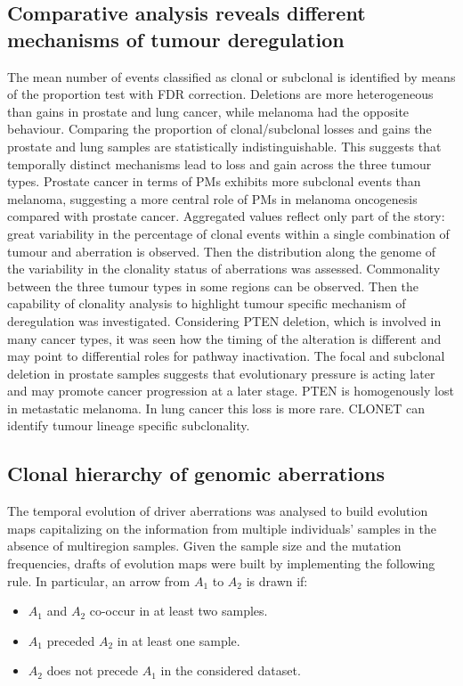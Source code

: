 	\subsection{Comparative analysis reveals different mechanisms of tumour deregulation}
	The mean number of events classified as clonal or subclonal is identified by means of the proportion test with FDR correction.
	Deletions are more heterogeneous than gains in prostate and lung cancer, while melanoma had the opposite behaviour.
	Comparing the proportion of clonal/subclonal losses and gains the prostate and lung samples are statistically indistinguishable.
	This suggests that temporally distinct mechanisms lead to loss and gain across the three tumour types.
	Prostate cancer in terms of PMs exhibits more subclonal events than melanoma, suggesting a more central role of PMs in melanoma oncogenesis compared with prostate cancer.
	Aggregated values reflect only part of the story: great variability in the percentage of clonal events within a single combination of tumour and aberration is observed.
	Then the distribution along the genome of the variability in the clonality status of aberrations was assessed.
	Commonality between the three tumour types in some regions can be observed.
	Then the capability of clonality analysis to highlight tumour specific mechanism of deregulation was investigated.
	Considering PTEN deletion, which is involved in many cancer types, it was seen how the timing of the alteration is different and may point to differential roles for pathway inactivation.
	The focal and subclonal deletion in prostate samples suggests that evolutionary pressure is acting later and may promote cancer progression at a later stage.
	PTEN is homogenously lost in metastatic melanoma.
	In lung cancer this loss is more rare.
	CLONET can identify tumour lineage specific subclonality.

	\subsection{Clonal hierarchy of genomic aberrations}
	The temporal evolution of driver aberrations was analysed to build evolution maps capitalizing on the information from multiple individuals' samples in the absence of multiregion samples.
	Given the sample size and the mutation frequencies, drafts of evolution maps were built by implementing the following rule.
	In particular, an arrow from $A_1$ to $A_2$ is drawn if:

	\begin{multicols}{2}
		\begin{itemize}
			\item $A_1$ and $A_2$ co-occur in at least two samples.
			\item $A_1$ preceded $A_2$ in at least one sample.
			\item $A_2$ does not precede $A_1$ in the considered dataset.
		\end{itemize}
	\end{multicols}

